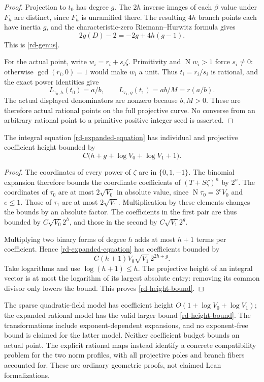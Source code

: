 \begin{proof}
Projection to $t_0$ has degree $g$. The $2h$ inverse images of
each $\beta$ value under $F_h$ are distinct, since $F_h$ is
unramified there. The resulting $4h$ branch points each have
inertia $g$, and the characteristic-zero Riemann--Hurwitz formula
\cite[Section~53.12]{StacksCurves2026} gives
\[
 2g(D)-2=-2g+4h(g-1).
\]
This is \eqref{rd-genus}.

For the actual point, write $w_i=r_i+s_i\zeta$. Primitivity and
$\operatorname N w_i>1$ force $s_i\ne0$: otherwise
$\gcd(r_i,0)=1$ would make $w_i$ a unit. Thus $t_i=r_i/s_i$
is rational, and the exact power identities give
\[
 L_{\tau_0,h}(t_0)=a/b,
 \qquad L_{\tau_1,g}(t_1)=ab/M=r(a/b).
\]
The actual displayed denominators are nonzero because $b,M>0$.
These are therefore actual rational points on the full projective
curve. No converse from an arbitrary rational point to a primitive
positive integer seed is asserted.
\end{proof}

\begin{proposition}\label{rd-expanded-height}
The integral equation \eqref{rd-expanded-equation} has individual
and projective coefficient height bounded by
\begin{equation}\label{rd-height-bound}
 C\bigl(h+g+\log V_0+\log V_1+1\bigr).
\end{equation}
\end{proposition}
\begin{proof}
The coordinates of every power of $\zeta$ are in $\{0,1,-1\}$.
The binomial expansion therefore bounds the coordinate coefficients
of $(T+S\zeta)^n$ by $2^n$. The coordinates of $\tau_0$ are
at most $2\sqrt{V_0}$ in absolute value, since
$\operatorname N\tau_0=3^eV_0$ and $e\le1$. Those of $\tau_1$
are at most $2\sqrt{V_1}$. Multiplication by these elements
changes the bounds by an absolute factor. The coefficients in the
first pair are thus bounded by $C\sqrt{V_0}2^h$, and those in
the second by $C\sqrt{V_1}2^g$.

Multiplying two binary forms of degree $h$ adds at most $h+1$
terms per coefficient. Hence \eqref{rd-expanded-equation} has
coefficients bounded by
\[
 C(h+1)V_0\sqrt{V_1}\,2^{2h+g}.
\]
Take logarithms and use $\log(h+1)\le h$. The projective height
of an integral vector is at most the logarithm of its largest
absolute entry: removing its common divisor only lowers the bound.
This proves \eqref{rd-height-bound}.
\end{proof}

The sparse quadratic-field model has coefficient height
$O(1+\log V_0+\log V_1)$; the expanded rational model has the
valid larger bound \eqref{rd-height-bound}. The transformations
include exponent-dependent expansions, and no exponent-free bound
is claimed for the latter model. Neither coefficient budget bounds
an actual point. The explicit rational maps instead identify a
concrete compatibility problem for the two norm profiles, with all
projective poles and branch fibers accounted for. These are ordinary
geometric proofs, not claimed Lean formalizations.
